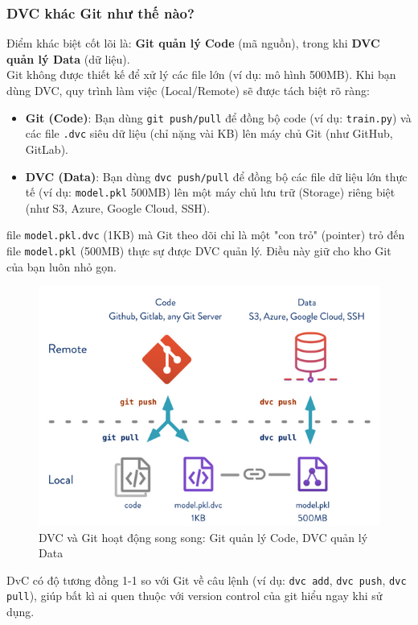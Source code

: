 \documentclass[11pt]{article}
\begin{document}
\subsubsection{DVC khác Git như thế nào?}
Điểm khác biệt cốt lõi là: \textbf{Git quản lý Code} (mã nguồn), trong khi \textbf{DVC quản lý Data} (dữ liệu). \\

\noindent Git không được thiết kế để xử lý các file lớn (ví dụ: mô hình 500MB). Khi bạn dùng DVC, quy trình làm việc (Local/Remote) sẽ được tách biệt rõ ràng:
\begin{itemize}
    \item \textbf{Git (Code)}: Bạn dùng \texttt{git push/pull} để đồng bộ code (ví dụ: \texttt{train.py}) và các file \texttt{.dvc} siêu dữ liệu (chỉ nặng vài KB) lên máy chủ Git (như GitHub, GitLab).
    \item \textbf{DVC (Data)}: Bạn dùng \texttt{dvc push/pull} để đồng bộ các file dữ liệu lớn thực tế (ví dụ: \texttt{model.pkl} 500MB) lên một máy chủ lưu trữ (Storage) riêng biệt (như S3, Azure, Google Cloud, SSH).
\end{itemize}




file \texttt{model.pkl.dvc} (1KB) mà Git theo dõi chỉ là một "con trỏ" (pointer) trỏ đến file \texttt{model.pkl} (500MB) thực sự được DVC quản lý. Điều này giữ cho kho Git của bạn luôn nhỏ gọn.

\begin{figure}[H]
    \centering
    \includegraphics[width=0.7\linewidth]{images/git_v_dvc.png}
    \caption{DVC và Git hoạt động song song: Git quản lý Code, DVC quản lý Data}
\end{figure}

\pagebreak

\noindent DvC có độ tương đồng 1-1 so với Git về câu lệnh (ví dụ: \texttt{dvc add}, \texttt{dvc push}, \texttt{dvc pull}), giúp bất kì ai quen thuộc với version control của git hiểu ngay khi sử dụng.
\end{document}
